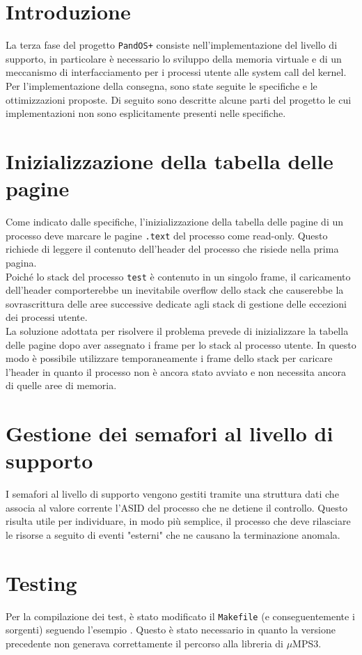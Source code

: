 \documentclass[11pt]{article}
\begin{document}
\newpage

\section{Introduzione}
La terza fase del progetto \texttt{PandOS+} consiste nell'implementazione del livello di supporto, 
in particolare è necessario lo sviluppo della memoria virtuale e di un meccanismo di interfacciamento per i processi utente alle system call del kernel.\\
Per l'implementazione della consegna, sono state seguite le specifiche e le ottimizzazioni proposte. 
Di seguito sono descritte alcune parti del progetto le cui implementazioni non sono esplicitamente presenti nelle specifiche.

\section{Inizializzazione della tabella delle pagine}
Come indicato dalle specifiche, l'inizializzazione della tabella delle pagine di un processo deve marcare le pagine \texttt{.text} del processo come read-only.
Questo richiede di leggere il contenuto dell'header del processo che risiede nella prima pagina. \\
Poiché lo stack del processo \texttt{test} è contenuto in un singolo frame, il caricamento dell'header comporterebbe un inevitabile overflow dello stack che 
causerebbe la sovrascrittura delle aree successive dedicate agli stack di gestione delle eccezioni dei processi utente. \\
La soluzione adottata per risolvere il problema prevede di inizializzare la tabella delle pagine dopo aver assegnato i frame per lo stack al processo utente.
In questo modo è possibile utilizzare temporaneamente i frame dello stack per caricare l'header in quanto il processo non è ancora stato avviato e non necessita ancora di quelle aree di memoria.

\section{Gestione dei semafori al livello di supporto}
I semafori al livello di supporto vengono gestiti tramite una struttura dati che associa al valore corrente l'ASID del processo che ne detiene il controllo.
Questo risulta utile per individuare, in modo più semplice, il processo che deve rilasciare le risorse a seguito di eventi "esterni" che ne causano la terminazione anomala.

\section{Testing}
Per la compilazione dei test, è stato modificato il \texttt{Makefile} (e conseguentemente i sorgenti) seguendo l'esempio \cite{1}. 
Questo è stato necessario in quanto la versione precedente non generava correttamente il percorso alla libreria di $\mu$MPS3.

\newpage
\printbibliography[title={Bibliografia}]
\end{document}
